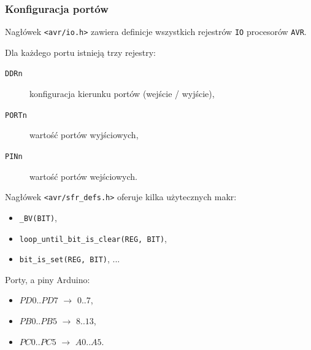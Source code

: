 \documentclass[8pt]{beamer}
\begin{document}
\begin{frame}
  \frametitle{Konfiguracja portów}

  \begin{block}{}
    Nagłówek \texttt{<avr/io.h>} zawiera definicje wszystkich rejestrów
    \texttt{IO} procesorów \texttt{AVR}.

    \vspace{1em}

    Dla każdego portu istnieją trzy rejestry:
    \begin{description}
      \item[\texttt{DDRn}] konfiguracja kierunku portów (wejście / wyjście),
      \item[\texttt{PORTn}] wartość portów wyjściowych,
      \item[\texttt{PINn}] wartość portów wejściowych.
    \end{description}
  \end{block}

  \begin{block}{}
    Nagłówek \texttt{<avr/sfr\_defs.h>} oferuje kilka użytecznych makr:
    \begin{itemize}
      \item \texttt{\_BV(BIT)},
      \item \texttt{loop\_until\_bit\_is\_clear(REG, BIT)},
      \item \texttt{bit\_is\_set(REG, BIT)}, ...
    \end{itemize}
  \end{block}

  \begin{block}{Porty, a piny Arduino:}
    \begin{itemize}
      \item $PD0..PD7$ $\rightarrow$ $0..7$,
      \item $PB0..PB5$ $\rightarrow$ $8..13$,
      \item $PC0..PC5$ $\rightarrow$ $A0..A5$.
    \end{itemize}
  \end{block}
\end{frame}
\end{document}
